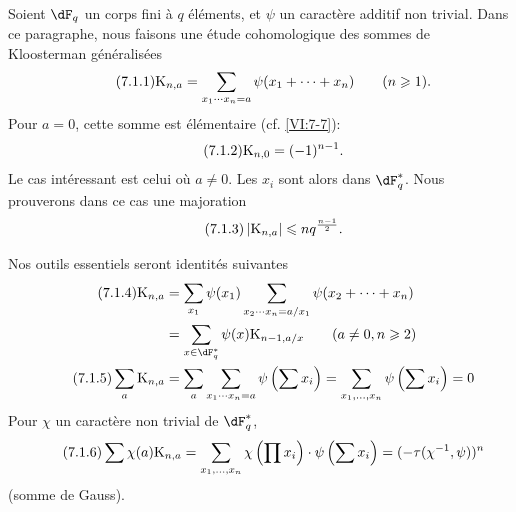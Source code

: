 \documentclass[oneside]{book}
\newcommand{\kloos}{\textnormal{K}} %
\theoremstyle{sga-source}
\theoremstyle{sga-source-dash}
\theoremstyle{sga-source-dotdash}
\theoremstyle{sga-source-number-note-dash}
\theoremstyle{sga-source-note-number-dotdash}
\theoremstyle{sga-source-example-dotdash}
\theoremstyle{sga-source-inline-number}
\theoremstyle{sga-source-bare-number}
\theoremstyle{sga-source}
\begin{document}
\subsection{}\label{VI:7-1}

Soient $\dF_q$ un corps fini à $q$ éléments, et $\psi$ un caractère 
additif non trivial. Dans ce paragraphe, nous faisons une étude cohomologique 
des sommes de Kloosterman généralisées 
\begin{equation*}\tag{7.1.1}\label{VI:eq:7-1-1}
  \kloos_{n,a} = \sum_{x_1\dotsm x_n = a} \psi(x_1+\cdots + x_n) \qquad (n\geqslant 1) \text{.} 
\end{equation*}
Pour $a=0$, cette somme est élémentaire (cf. \ref{VI:7-7}): 
\begin{equation*}\tag{7.1.2}\label{VI:eq:7-1-2}
  \kloos_{n,0} = (-1)^{n-1} \text{.} 
\end{equation*}
Le cas intéressant est celui où $a\ne 0$. Les $x_i$ sont alors dans 
$\dF_q^\ast$. Nous prouverons dans ce cas une majoration 
\begin{equation*}\tag{7.1.3}\label{VI:eq:7-1-3}
  \left|\kloos_{n,a}\right| \leqslant n q^{\frac{n-1}{2}} \text{.} 
\end{equation*}

Nos outils essentiels seront  
identités suivantes 
\begin{align*}\tag{7.1.4}\label{VI:eq:7-1-4}
  \kloos_{n,a} &= \sum_{x_1} \psi(x_1) \sum_{x_2\dotsm x_n = a/x_1} \psi(x_2+\cdots + x_n) \\ \notag
    &= \sum_{x\in \dF_q^\ast} \psi(x) \kloos_{n-1,a/x} \qquad (a\ne 0,n\geqslant 2) \\ \tag{7.1.5}\label{VI:eq:7-1-5}
  \sum_a \kloos_{n,a} &= \sum_a \sum_{x_1 \dotsm x_n = a} \psi\left(\sum x_i\right) = \sum_{x_1,\dots,x_n} \psi\left(\sum x_i\right) = 0 
\end{align*}
Pour $\chi$ un caractère non trivial de $\dF_q^\ast$, 
\begin{equation*}\tag{7.1.6}\label{VI:eq:7-1-6}
  \sum \chi(a) \kloos_{n,a} = \sum_{x_1,\dots,x_n} \chi\left(\prod x_i\right) \cdot \psi\left(\sum x_i\right) = (-\tau(\chi^{-1},\psi))^n 
\end{equation*}
(somme de Gauss). 





\subsection{}\label{VI:7-2}
\end{document}

